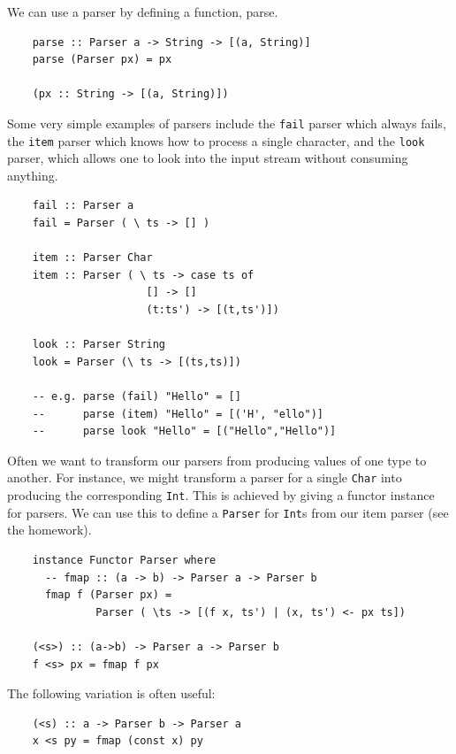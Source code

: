 \documentclass[a4paper,12pt]{article}
\theoremstyle{remark}
\begin{document}
We can use a parser by defining a function, parse.

\begin{lstlisting}
    parse :: Parser a -> String -> [(a, String)]
    parse (Parser px) = px

    (px :: String -> [(a, String)])  \end{lstlisting}

Some very simple examples of parsers include the \lstinline{fail} parser which always fails,
the \lstinline{item} parser which knows how to process a single character, and the
\lstinline{look} parser, which allows one to look into the input stream without consuming anything.

\begin{lstlisting}
    fail :: Parser a
    fail = Parser ( \ ts -> [] )

    item :: Parser Char
    item :: Parser ( \ ts -> case ts of
                      [] -> []
                      (t:ts') -> [(t,ts')])

    look :: Parser String
    look = Parser (\ ts -> [(ts,ts)])

    -- e.g. parse (fail) "Hello" = []
    --      parse (item) "Hello" = [('H', "ello")]
    --      parse look "Hello" = [("Hello","Hello")]  \end{lstlisting}

Often we want to transform our parsers from producing values of one type to
another. For instance, we might transform a parser for a single \lstinline{Char} into producing
the corresponding \lstinline{Int}. This is achieved by giving a functor instance for parsers.
We can use this to define a \lstinline{Parser} for \lstinline{Int}s from our item parser (see the homework).


\begin{lstlisting}
    instance Functor Parser where
      -- fmap :: (a -> b) -> Parser a -> Parser b
      fmap f (Parser px) =
              Parser ( \ts -> [(f x, ts') | (x, ts') <- px ts])

    (<s>) :: (a->b) -> Parser a -> Parser b
    f <s> px = fmap f px  \end{lstlisting}

The following variation is often useful:

\begin{lstlisting}
    (<s) :: a -> Parser b -> Parser a
    x <s py = fmap (const x) py  \end{lstlisting}
\end{document}
